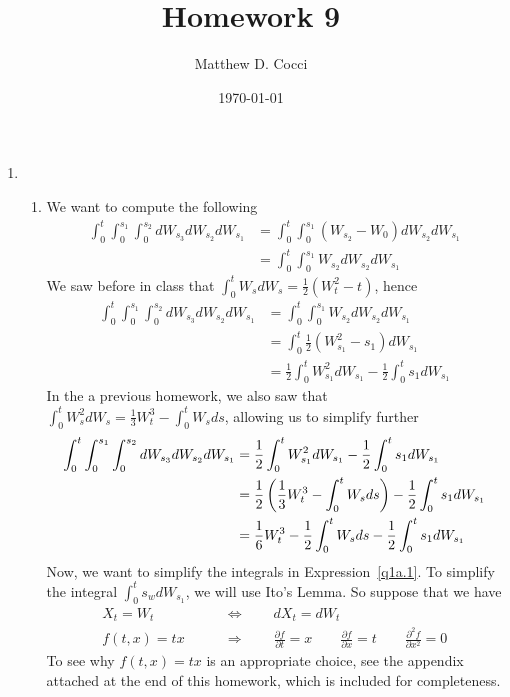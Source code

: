 \documentclass[12pt]{article}
\author{Matthew D. Cocci}
\title{Homework 9}
\date{\today}
\theoremstyle{plain}
\theoremstyle{definition}
\theoremstyle{remark}
\begin{document}
\maketitle



\begin{enumerate}
  \item %
    \begin{enumerate}
      \item %
        We want to compute the following
        \begin{align*}
          \int^t_0 \int_0^{s_1} \int_0^{s_2} dW_{s_3}dW_{s_2}dW_{s_1}
          &= \int^t_0 \int_0^{s_1} (W_{s_2}-W_0)dW_{s_2}dW_{s_1}\\
          &= \int^t_0 \int_0^{s_1} W_{s_2}dW_{s_2}dW_{s_1}
        \end{align*}
        We saw before in class that $\int^t_0 W_s dW_s =
        \frac{1}{2}(W_t^2-t)$, hence
        \begin{align*}
          \int^t_0 \int_0^{s_1} \int_0^{s_2} dW_{s_3}dW_{s_2}dW_{s_1}
          &= \int^t_0 \int_0^{s_1} W_{s_2}dW_{s_2}dW_{s_1}\\
          &= \int^t_0 \frac{1}{2}\left(
              W_{s_1}^2 - s_1
              \right)dW_{s_1}\\
          &= \frac{1}{2}\int^t_0 W_{s_1}^2 dW_{s_1}
              -\frac{1}{2} \int^t_0s_1 dW_{s_1}
        \end{align*}
        In the a previous homework, we also saw that $\int^t_0 W_s^2
        dW_s = \frac{1}{3}W_t^3 - \int^t_0 W_s ds$, allowing us to
        simplify further
        \begin{align}
          \int^t_0 \int_0^{s_1} \int_0^{s_2} dW_{s_3}dW_{s_2}dW_{s_1}
          &= \frac{1}{2}\int^t_0 W_{s_1}^2 dW_{s_1}
              -\frac{1}{2} \int^t_0s_1 dW_{s_1}\notag\\
          &= \frac{1}{2}\left(\frac{1}{3}W_t^3 - \int^t_0 W_s ds\right)
              -\frac{1}{2} \int^t_0s_1 dW_{s_1}\notag\\
          &= \frac{1}{6}W_t^3 - \frac{1}{2}\int^t_0 W_s ds
            -\frac{1}{2} \int^t_0s_1 dW_{s_1} \label{q1a.1}
        \end{align}
        Now, we want to simplify the integrals in
        Expression~\ref{q1a.1}. To simplify the integral $\int^t_0 s_w
        dW_{s_1}$, we will use Ito's Lemma. So suppose that we have
        \begin{align*}
          X_t = W_t \qquad &\Leftrightarrow \qquad dX_t = dW_t \\
          f(t,x) = tx \qquad &\Rightarrow \qquad
          \frac{\partial f}{\partial t} = x
          \qquad \frac{\partial f}{\partial x} = t
          \qquad \frac{\partial^2 f}{\partial x^2} = 0
        \end{align*}
        To see why $f(t,x)=tx$ is an appropriate choice, see the
        appendix attached at the end of this homework, which is included
        for completeness.


\end{enumerate}
\end{enumerate}
\end{document}
